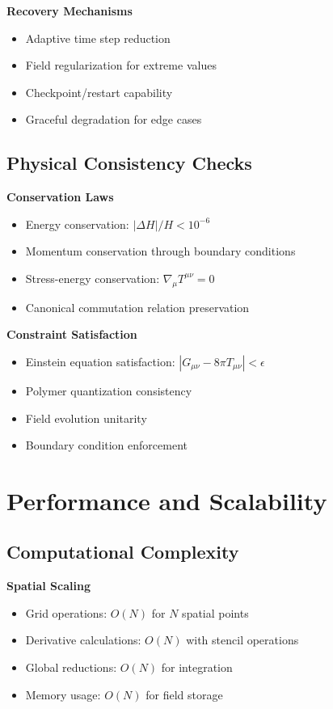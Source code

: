 \documentclass[11pt]{article}
\begin{document}
\textbf{Recovery Mechanisms}
\begin{itemize}
\item Adaptive time step reduction
\item Field regularization for extreme values
\item Checkpoint/restart capability
\item Graceful degradation for edge cases
\end{itemize}

\subsection{Physical Consistency Checks}

\textbf{Conservation Laws}
\begin{itemize}
\item Energy conservation: $|\Delta H|/H < 10^{-6}$
\item Momentum conservation through boundary conditions
\item Stress-energy conservation: $\nabla_\mu T^{\mu\nu} = 0$
\item Canonical commutation relation preservation
\end{itemize}

\textbf{Constraint Satisfaction}
\begin{itemize}
\item Einstein equation satisfaction: $|G_{\mu\nu} - 8\pi T_{\mu\nu}| < \epsilon$
\item Polymer quantization consistency
\item Field evolution unitarity
\item Boundary condition enforcement
\end{itemize}

\section{Performance and Scalability}

\subsection{Computational Complexity}

\textbf{Spatial Scaling}
\begin{itemize}
\item Grid operations: $O(N)$ for $N$ spatial points
\item Derivative calculations: $O(N)$ with stencil operations
\item Global reductions: $O(N)$ for integration
\item Memory usage: $O(N)$ for field storage
\end{itemize}
\end{document}
